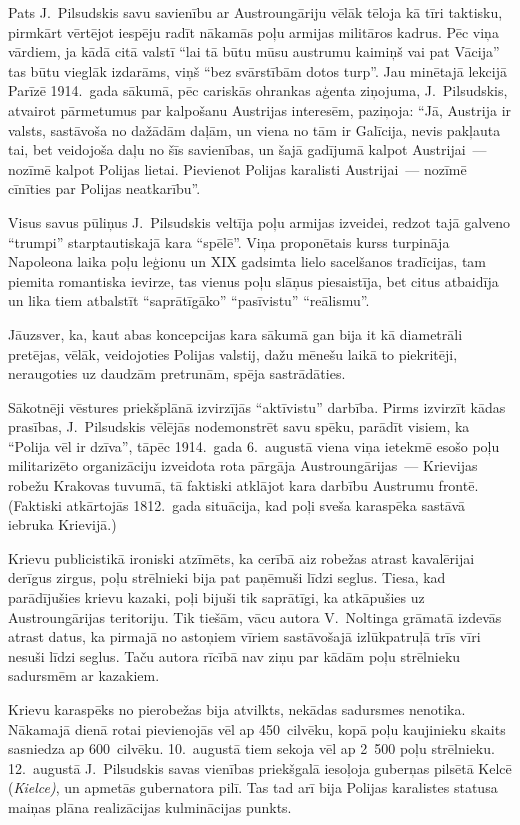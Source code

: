 \documentclass[twoside,a5paper,12pt,fleqn,openany]{extbook}
\newcommand{\pltxti}[1]{\textit{\textpolish{#1}}}
\begin{document}
Pats J.~Pilsudskis savu savienību ar Austroungāriju vēlāk tēloja kā tīri taktisku, pirmkārt vērtējot iespēju radīt nākamās poļu armijas militāros kadrus. Pēc viņa vārdiem, ja kādā citā valstī ``lai tā būtu mūsu austrumu kaimiņš vai pat Vācija'' tas būtu vieglāk izdarāms, viņš ``bez svārstībām dotos turp''. Jau minētajā lekcijā Parīzē 1914.~gada sākumā, pēc cariskās ohrankas aģenta ziņojuma, J.~Pilsudskis, atvairot pārmetumus par kalpošanu Austrijas interesēm, paziņoja: ``Jā, Austrija ir valsts, sastāvoša no dažādām daļām, un viena no tām ir Galīcija, nevis pakļauta tai, bet veidojoša daļu no šīs savienības, un šajā gadījumā kalpot Austrijai~--- nozīmē kalpot Polijas lietai. Pievienot Polijas karalisti Austrijai~--- nozīmē cīnīties par Polijas neatkarību''.

Visus savus pūliņus J.~Pilsudskis veltīja poļu armijas izveidei, redzot tajā galveno ``trumpi'' starptautiskajā kara ``spēlē''. Viņa proponētais kurss turpināja Napoleona laika poļu leģionu un XIX gadsimta lielo sacelšanos tradīcijas, tam piemita romantiska ievirze, tas vienus poļu slāņus piesaistīja, bet citus atbaidīja un lika tiem atbalstīt ``saprātīgāko'' ``pasīvistu'' ``reālismu''.

Jāuzsver, ka, kaut abas koncepcijas kara sākumā gan bija it kā diametrāli pretējas, vēlāk, veidojoties Polijas valstij, dažu mēnešu laikā to piekritēji, neraugoties uz daudzām pretrunām, spēja sastrādāties.

Sākotnēji vēstures priekšplānā izvirzījās ``aktīvistu'' darbība. Pirms izvirzīt kādas prasības, J.~Pilsudskis vēlējās nodemonstrēt savu spēku, parādīt visiem, ka ``Polija vēl ir dzīva'', tāpēc 1914.~gada 6.~augustā viena viņa ietekmē esošo poļu militarizēto organizāciju izveidota rota pārgāja Austroungārijas~--- Krievijas robežu Krakovas tuvumā, tā faktiski atklājot kara darbību Austrumu frontē. (Faktiski atkārtojās 1812.~gada situācija, kad poļi sveša karaspēka sastāvā iebruka Krievijā.)

Krievu publicistikā ironiski atzīmēts, ka cerībā aiz robežas atrast kavalērijai derīgus zirgus, poļu strēlnieki bija pat paņēmuši līdzi seglus. Tiesa, kad parādījušies krievu kazaki, poļi bijuši tik saprātīgi, ka atkāpušies uz Austroungārijas teritoriju. Tik tiešām, vācu autora V.~Noltinga grāmatā izdevās atrast datus, ka pirmajā no astoņiem vīriem sastāvošajā izlūkpatruļā trīs vīri nesuši līdzi seglus. Taču autora rīcībā nav ziņu par kādām poļu strēlnieku sadursmēm ar kazakiem.

Krievu karaspēks no pierobežas bija atvilkts, nekādas sadursmes nenotika. Nākamajā dienā rotai pievienojās vēl ap 450~cilvēku, kopā poļu kaujinieku skaits sasniedza ap 600~cilvēku. 10.~augustā tiem sekoja vēl ap 2~500 poļu strēlnieku. 12.~augustā J.~Pilsudskis savas vienības priekšgalā iesoļoja guberņas pilsētā Kelcē (\pltxti{Kielce)}, un apmetās gubernatora pilī. Tas tad arī bija Polijas karalistes statusa maiņas plāna realizācijas kulminācijas punkts.
\end{document}
